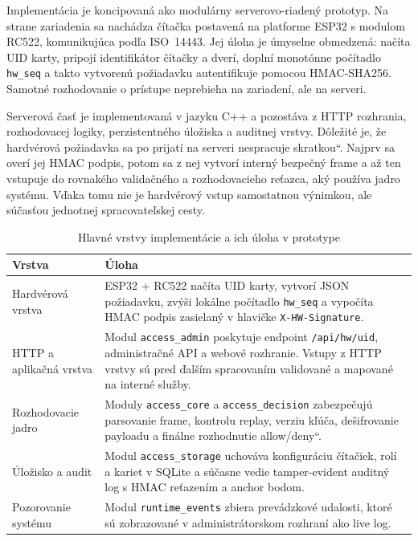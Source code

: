 \documentclass[journal,a4paper,onecolumn]{IEEEtran}
\newcommand{\uv}[1]{\quotedblbase#1\textquotedblleft}
\begin{document}
Implementácia je koncipovaná ako modulárny serverovo-riadený prototyp. Na strane zariadenia sa nachádza čítačka postavená na platforme ESP32\cite{Espressif2024} s modulom RC522, komunikujúca podľa ISO~14443\cite{ISO14443}. Jej úloha je úmyselne obmedzená: načíta UID karty, pripojí identifikátor čítačky a dverí, doplní monotónne počítadlo \texttt{hw\_seq} a takto vytvorenú požiadavku autentifikuje pomocou HMAC-SHA256. Samotné rozhodovanie o prístupe neprebieha na zariadení, ale na serveri.

Serverová časť je implementovaná v jazyku C++ a pozostáva z HTTP rozhrania, rozhodovacej logiky, perzistentného úložiska a auditnej vrstvy. Dôležité je, že hardvérová požiadavka sa po prijatí na serveri nespracuje \uv{skratkou}. Najprv sa overí jej HMAC podpis, potom sa z nej vytvorí interný bezpečný frame a až ten vstupuje do rovnakého validačného a rozhodovacieho reťazca, aký používa jadro systému. Vďaka tomu nie je hardvérový vstup samostatnou výnimkou, ale súčasťou jednotnej spracovateľskej cesty.

\begin{table}[h]
\renewcommand{\arraystretch}{1.3}
\centering
\caption{Hlavné vrstvy implementácie a ich úloha v prototype}
\begin{tabular}{|p{3.0cm}|p{9.0cm}|}
\hline
\textbf{Vrstva} & \textbf{Úloha} \\
\hline
Hardvérová vrstva & ESP32 + RC522 načíta UID karty, vytvorí JSON požiadavku, zvýši lokálne počítadlo \texttt{hw\_seq} a vypočíta HMAC podpis zasielaný v hlavičke \texttt{X-HW-Signature}. \\
\hline
HTTP a aplikačná vrstva & Modul \texttt{access\_admin} poskytuje endpoint \texttt{/api/hw/uid}, administračné API a webové rozhranie. Vstupy z HTTP vrstvy sú pred ďalším spracovaním validované a mapované na interné služby. \\
\hline
Rozhodovacie jadro & Moduly \texttt{access\_core} a \texttt{access\_decision} zabezpečujú parsovanie frame, kontrolu replay, verziu kľúča, dešifrovanie payloadu a finálne rozhodnutie \uv{allow/deny}. \\
\hline
Úložisko a audit & Modul \texttt{access\_storage} uchováva konfiguráciu čítačiek, rolí a kariet v SQLite a súčasne vedie tamper-evident auditný log s HMAC reťazením a anchor bodom. \\
\hline
Pozorovanie systému & Modul \texttt{runtime\_events} zbiera prevádzkové udalosti, ktoré sú zobrazované v administrátorskom rozhraní ako live log. \\
\hline
\end{tabular}
\end{table}
\end{document}
